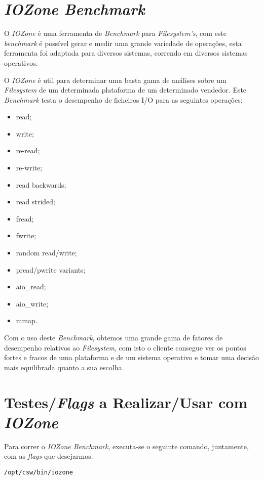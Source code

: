 \documentclass[conference,compsoc]{IEEEtran}
\begin{document}
\section{\textit{IOZone Benchmark}}

O \textit{IOZone} é uma ferramenta de \textit{Benchmark} para \textit{Filesystem's}, com este \textit{benchmark} é possível gerar e medir uma grande variedade de operações, esta ferramenta foi adaptada para diversos sistemas, correndo em diversos sistemas operativos.

O \textit{IOZone} é util para determinar uma basta gama de análises sobre um \textit{Filesystem} de um determinada plataforma de um determinado vendedor. Este \textit{Benchmark} testa o desempenho de ficheiros I/O para as seguintes operações:

\begin{itemize}
	\item read;
	\item write;
	\item re-read;
	\item re-write;
	\item read backwards;
	\item read strided;
	\item fread; 
	\item fwrite;
	\item random read/write;
	\item pread/pwrite variants;
	\item aio\_read;
	\item aio\_write;
	\item mmap.
\end{itemize}

Com o uso deste \textit{Benchmark}, obtemos uma grande gama de fatores de desempenho relativos ao \textit{Filesystem}, com isto o cliente consegue ver os pontos fortes e fracos de uma plataforma e de um sistema operativo e tomar uma decisão mais equilibrada quanto a sua escolha.  

\section{Testes/\textit{Flags} a Realizar/Usar com \textit{IOZone}}

Para correr o \textit{IOZone Benchmark}, executa-se o seguinte comando, juntamente, com as \textit{flags} que desejarmos.

\begin{lstlisting}
/opt/csw/bin/iozone
\end{lstlisting}
\end{document}
